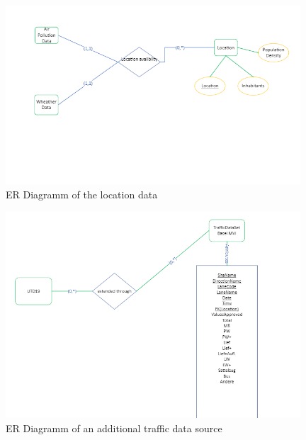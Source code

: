 \documentclass{article}
\begin{document}
\begin{figure}[H]
\centering
\includegraphics[width=11cm]{fourth.png}
\caption{ER Diagramm of the location data}
\end{figure}

\begin{figure}[H]
\centering
\includegraphics[width=11cm]{fifth.png}
\caption{ER Diagramm of an additional traffic data source}
\end{figure}


\end{document}
